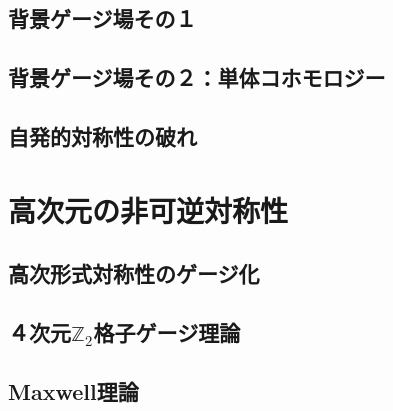 \documentclass[report,paper=a4, fontsize=12pt, line_length=16cm, number_of_lines=33,dvipdfmx]{jlreq}
\numberwithin{equation}{chapter}
\newcommand{\Ztwo}{\mbox{$\mathbb{Z}_{2}$}}
\begin{document}
\section{背景ゲージ場その１}
\section{背景ゲージ場その２：単体コホモロジー}
\section{自発的対称性の破れ}


\chapter{高次元の非可逆対称性}
\section{高次形式対称性のゲージ化}
\section{４次元\texorpdfstring{\Ztwo}{Z2}格子ゲージ理論}
\section{Maxwell理論}



\end{document}
